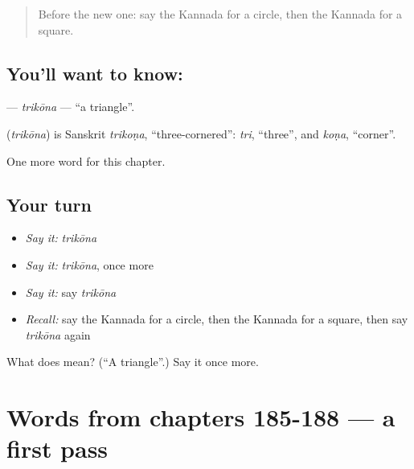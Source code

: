 \label{lesson:KA-C193-trikona}



\begin{quote}
Before the new one: say the Kannada for a circle, then the Kannada for a square.
\end{quote}

\subsection*{You'll want to know: }
\textbf{} — \emph{trikōna} — \textquotedblleft{}a triangle\textquotedblright{}.

\begin{cousinweb}
\textbf{} (\emph{trikōna}) is Sanskrit \emph{trikoṇa}, \textquotedblleft{}three-cornered\textquotedblright{}: \emph{tri}, \textquotedblleft{}three\textquotedblright{}, and \emph{koṇa}, \textquotedblleft{}corner\textquotedblright{}.
\end{cousinweb}

\begin{grammarlens}[title={What you've built}]
One more word for this chapter.
\end{grammarlens}

\subsection*{Your turn}
\begin{itemize}
\raggedright
  \item \emph{Say it:} \emph{trikōna}
  \item \emph{Say it:} \emph{trikōna}, once more
  \item \emph{Say it:} say \emph{trikōna}
  \item \emph{Recall:} say the Kannada for a circle, then the Kannada for a square, then say \emph{trikōna} again
\end{itemize}

\begin{tcolorbox}[breakable,colback=teal!4,colframe=teal!35!black,title={Before you move on}]
What does  mean? (\textquotedblleft{}A triangle\textquotedblright{}.) Say it once more.
\end{tcolorbox}
\section[(dialogue)]{Words from chapters 185-188 — a first pass}


